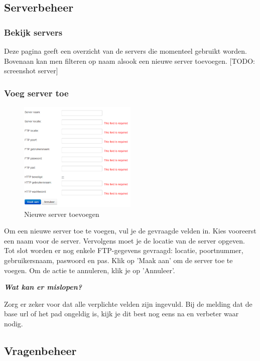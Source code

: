 \documentclass[]{article}
\begin{document}
\subsection{Serverbeheer}

\subsubsection{Bekijk servers}
Deze pagina geeft een overzicht van de servers die momenteel gebruikt worden. Bovenaan kan men filteren op naam alsook een nieuwe server toevoegen. [TODO: screenshot server]

\subsubsection{Voeg server toe}

\begin{figure}[!ht]
	\centering
	\includegraphics[width=0.5\textwidth]{img/new_server}
	\caption{Nieuwe server toevoegen}
	\label{new_server}
\end{figure}

Om een nieuwe server toe te voegen, vul je de gevraagde velden in. Kies vooreerst een naam voor de server. Vervolgens moet je de locatie van de server opgeven. Tot slot worden er nog enkele FTP-gegevens gevraagd: locatie, poortnummer, gebruikersnaam, paswoord en pas. Klik op 'Maak aan' om de server toe te voegen. Om de actie te annuleren, klik je op 'Annuleer'.

\textbf{\textit{Wat kan er mislopen?}}

Zorg er zeker voor dat alle verplichte velden zijn ingevuld. Bij de melding dat de base url of het pad ongeldig is, kijk je dit best nog eens na en verbeter waar nodig.

\subsection{Vragenbeheer}
\end{document}
